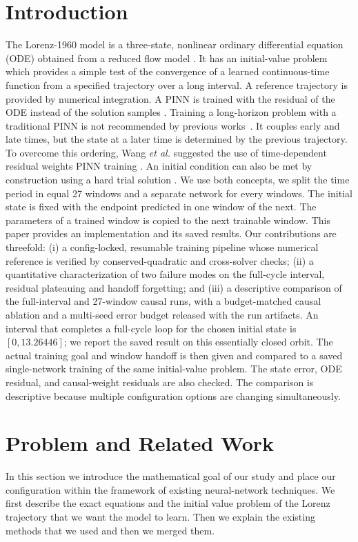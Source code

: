 \documentclass[conference]{IEEEtran}
\begin{document}
\section{Introduction}
The Lorenz-1960 model is a three-state, nonlinear ordinary differential equation (ODE) obtained from a reduced flow model \cite{lorenz1960}. It has an initial-value problem which provides a simple test of the convergence of a learned continuous-time function from a specified trajectory over a long interval. A reference trajectory is provided by numerical integration. A PINN is trained with the residual of the ODE instead of the solution samples \cite{raissi2019}. Training a long-horizon problem with a traditional PINN is not recommended by previous works~\cite{wang2024causal,krishnapriyan2021}. It couples early and late times, but the state at a later time is determined by the previous trajectory. To overcome this ordering, Wang \emph{et al.} suggested the use of time-dependent residual weights PINN training \cite{wang2024causal}. An initial condition can also be met by construction using a hard trial solution  \cite{lagaris1998}. We use both concepts, we split the time period in equal 27 windows and a separate network for every windows. The initial state is fixed with the endpoint predicted in one window of the next. The parameters of a trained window is copied to the next trainable window. This paper provides an implementation and its saved results. Our contributions are threefold: (i) a config-locked, resumable training pipeline whose numerical reference is verified by conserved-quadratic and cross-solver checks; (ii) a quantitative characterization of two failure modes on the full-cycle interval, residual plateauing and handoff forgetting; and (iii) a descriptive comparison of the full-interval and 27-window causal runs, with a budget-matched causal ablation and a multi-seed error budget released with the run artifacts. An interval that completes a full-cycle loop for the chosen initial state is $[0,13.26446]$; we report the saved result on this essentially closed orbit. The actual training goal and window handoff is then given and compared to a saved single-network training of the same initial-value problem. The state error, ODE residual, and causal-weight residuals are also checked. The comparison is descriptive because multiple configuration options are changing simultaneously.



\section{Problem and Related Work}
In this section we introduce the mathematical goal of our study and place our configuration within the framework of existing neural-network techniques. We first describe the exact equations and the initial value problem of the Lorenz trajectory that we want the model to learn. Then we explain the existing methods that we used and then we merged them.
\end{document}
